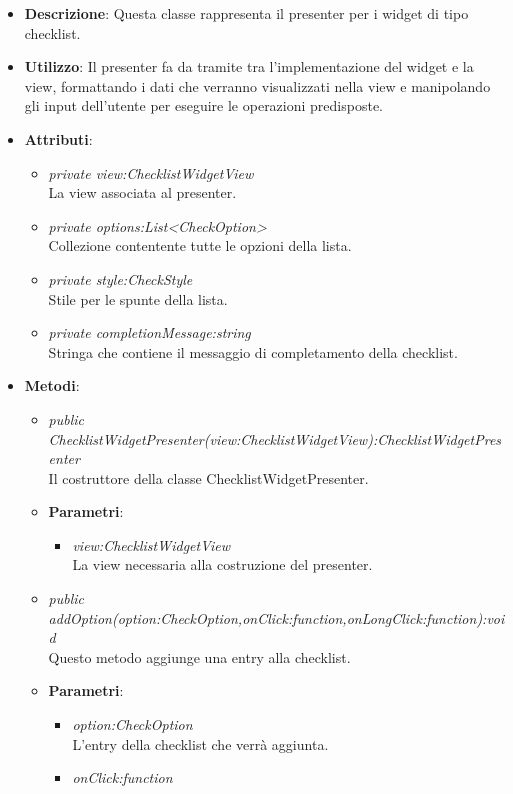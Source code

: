 \begin{itemize}
\item \textbf{Descrizione}: Questa classe rappresenta il presenter per i widget di tipo checklist.
\item \textbf{Utilizzo}: Il presenter fa da tramite tra l'implementazione del widget e la view, formattando i dati che verranno visualizzati nella view e manipolando gli input dell'utente per eseguire le operazioni predisposte.
\item \textbf{Attributi}:
	\begin{itemize}
	\item \textit{private view:ChecklistWidgetView}\\
	La view associata al presenter.
	\item \textit{private options:List<CheckOption>}\\
	Collezione contentente tutte le opzioni della lista.
	\item \textit{private style:CheckStyle}\\
	Stile per le spunte della lista.
	\item \textit{private completionMessage:string}\\
	Stringa che contiene il messaggio di completamento della checklist.
	\end{itemize}
\item \textbf{Metodi}:
	\begin{itemize}
	\item \textit{public ChecklistWidgetPresenter(view:ChecklistWidgetView):ChecklistWidgetPresenter}\\
	Il costruttore della classe ChecklistWidgetPresenter.
		\item{\textbf{Parametri}: \begin{itemize}
		\item \textit{view:ChecklistWidgetView}\\
		La view necessaria alla costruzione del presenter.
		\end{itemize}}
	\item \textit{public addOption(option:CheckOption,onClick:function,onLongClick:function):void}\\
	Questo metodo aggiunge una entry alla checklist.
		\item{\textbf{Parametri}: \begin{itemize}
		\item \textit{option:CheckOption}\\
		L'entry della checklist che verrà aggiunta.
		\item \textit{onClick:function}\\

\end{itemize}}
\end{itemize}
\end{itemize}

